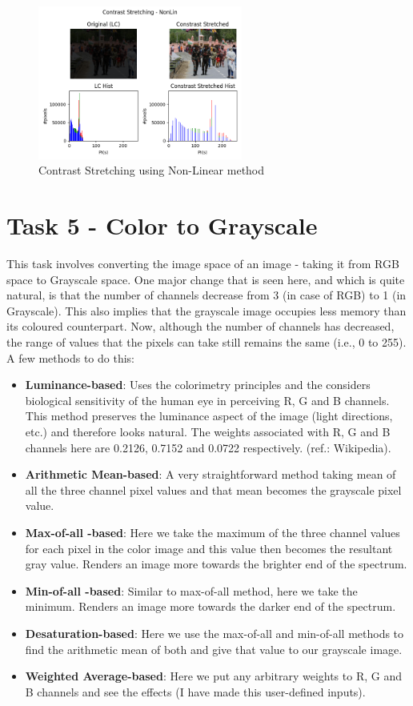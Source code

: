 \documentclass[notitlepage]{report}
\begin{document}
\begin{figure}[htp]
    \centering
    \hypertarget{CStretch_Lin}{\includegraphics[width = 0.6\textwidth]{CStretch_NL.png}}
    \caption{Contrast Stretching using Non-Linear method}
    \label{fig7:sysfig}
\end{figure}

\section{Task 5 - Color to Grayscale}
This task involves converting the image space of an image - taking it from RGB space to Grayscale space. One major change
that is seen here, and which is quite natural, is that the number of channels decrease from 3 (in case of RGB) to 1 (in Grayscale).
This also implies that the grayscale image occupies less memory than its coloured counterpart. Now, although the number of channels has
decreased, the range of values that the pixels can take still remains the same (i.e., 0 to 255). A few methods to do this:
\begin{itemize}
    \item \textbf{Luminance-based}: Uses the colorimetry principles and the considers biological sensitivity of the human eye 
    in perceiving R, G and B channels. This method preserves the luminance aspect of the image (light directions, etc.) and therefore
    looks natural. The weights associated with R, G and B channels here are 0.2126, 0.7152 and 0.0722 respectively. (ref.: Wikipedia).
    \item \textbf{Arithmetic Mean-based}: A very straightforward method taking mean of all the three channel pixel values and that mean 
    becomes the grayscale pixel value.
    \item \textbf{Max-of-all -based}: Here we take the maximum of the three channel values for each pixel in the color image and this value
    then becomes the resultant gray value. Renders an image more towards the brighter end of the spectrum.
    \item \textbf{Min-of-all -based}: Similar to max-of-all method, here we take the minimum. Renders an image more towards the darker end of the
    spectrum.
    \item \textbf{Desaturation-based}: Here we use the max-of-all and min-of-all methods to find the arithmetic mean of both and give that
    value to our grayscale image.
    \item \textbf{Weighted Average-based}: Here we put any arbitrary weights to R, G and B channels and see the effects (I have made this
    user-defined inputs).
\end{itemize}
\end{document}
